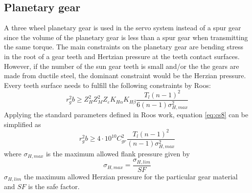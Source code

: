 \subsection*{Planetary gear}
A three wheel planetary gear is used in the servo system instead of a spur gear since the volume of the planetary gear is less than a spur gear when transmitting the same torque. The main constraints on the planetary gear are bending stress in the root of a gear teeth and Hertzian pressure at the teeth contact surfaces. However, if the number of the sun gear teeth is small and/or the the gears are made from ductile steel, the dominant constraint would be the Herzian pressure. Every teeth surface needs to fulfill the following constraints by Roos:
\begin{equation} \label{eq:cs8}
r_g^2b \geqslant Z_H^2Z_M^2Z_{\varepsilon}K_{H\alpha}K_{H\beta}\frac{T_l(n-1)^2}{6(n-1)\sigma_{H,max}^2}
\end{equation}
Applying the standard parameters defined in Roos work, equation \ref{eq:cs8} can be simplified as
\begin{equation} \label{eq:cs9}
r_g^2b \geqslant 4\cdot10^{10}C_{gr}^2\frac{T_l(n-1)^2}{(n-1)\sigma_{H,max}^2}
\end{equation}
where $\sigma_{H,max}$ is the maximum allowed flank pressure given by
\begin{equation} \label{eq:cs10}
\sigma_{H,max}=\frac{\sigma_{H,lim}}{SF}
\end{equation}
$\sigma_{H,lim}$ the maximum allowed Herzian pressure for the particular gear material and $SF$ is the safe factor.

